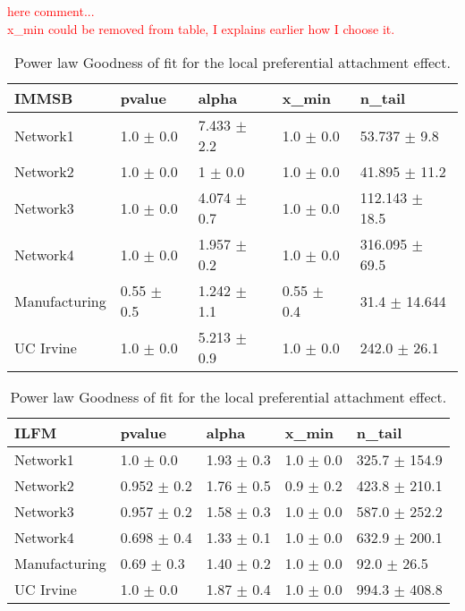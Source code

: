 \documentclass[a4paper, 12pt]{article}
\begin{document}
\textcolor{red}{here comment...} ~\\
\textcolor{red}{x\_min could be removed from table, I explains earlier how I choose it.}





\begin{table}
    \caption{Power law Goodness of fit for the local preferential attachment effect.}
\centering
    \begin{tabular}{lllll}                                                                                    
    \hline                                                                
        \textbf{IMMSB}  & pvalue         & alpha           & x\_min          & n\_tail             \\            
    \hline                                                                                                    
    Network1     & 1.0 $\pm$ 0.0    & 7.433 $\pm$ 2.2 & 1.0 $\pm$ 0.0    & 53.737 $\pm$ 9.8   \\
    Network2     & 1.0 $\pm$ 0.0    & 1 $\pm$ 0.0    & 1.0 $\pm$ 0.0    & 41.895 $\pm$ 11.2  \\                             
    Network3     & 1.0 $\pm$ 0.0    & 4.074 $\pm$ 0.7 & 1.0 $\pm$ 0.0    & 112.143 $\pm$ 18.5 \\                
    Network4     & 1.0 $\pm$ 0.0    & 1.957 $\pm$ 0.2 & 1.0 $\pm$ 0.0    & 316.095 $\pm$ 69.5 \\
    Manufacturing & 0.55 $\pm$ 0.5 & 1.242 $\pm$ 1.1 & 0.55 $\pm$ 0.4 & 31.4 $\pm$ 14.644    \\              
    UC Irvine     & 1.0 $\pm$ 0.0    & 5.213 $\pm$ 0.9 & 1.0 $\pm$ 0.0    & 242.0 $\pm$ 26.1   \\                
    \hline                                                                
    \end{tabular}    

    \begin{tabular}{lllll}
    \hline
        \textbf{ILFM} & pvalue          & alpha           & x\_min           & n\_tail              \\
    \hline
    Network1     & 1.0 $\pm$ 0.0     & 1.93 $\pm$ 0.3  & 1.0 $\pm$ 0.0     & 325.7 $\pm$ 154.9 \\
    Network2     & 0.952 $\pm$ 0.2 & 1.76 $\pm$ 0.5 & 0.9 $\pm$ 0.2 & 423.8 $\pm$ 210.1  \\
    Network3     & 0.957 $\pm$ 0.2 & 1.58 $\pm$ 0.3 & 1.0 $\pm$ 0.0     & 587.0 $\pm$ 252.2 \\
    Network4     & 0.698 $\pm$ 0.4 & 1.33 $\pm$ 0.1 & 1.0 $\pm$ 0.0     & 632.9 $\pm$ 200.1  \\
    Manufacturing & 0.69 $\pm$ 0.3   & 1.40 $\pm$ 0.2 & 1.0 $\pm$ 0.0     & 92.0 $\pm$ 26.5     \\
    UC Irvine     & 1.0 $\pm$ 0.0     & 1.87 $\pm$ 0.4   & 1.0 $\pm$ 0.0     & 994.3 $\pm$ 408.8 \\
    \hline
    \end{tabular}
\label{table:local_gof}
\end{table}
\end{document}
